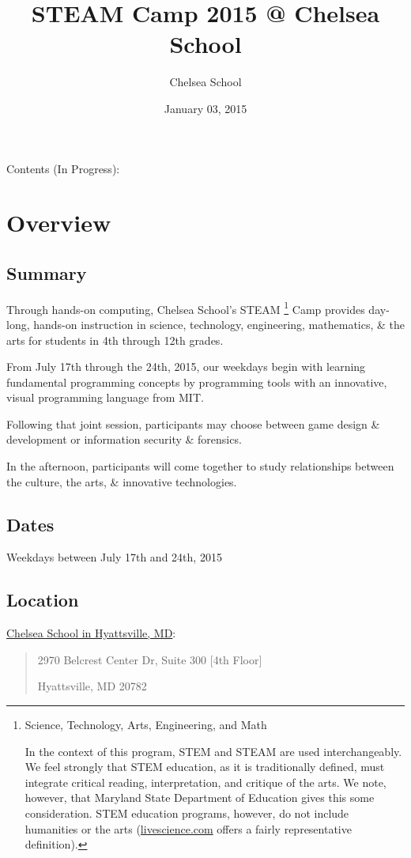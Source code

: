 \documentclass[letterpaper,10pt,english]{sphinxmanual}
\title{STEAM Camp 2015 @ Chelsea School}
\date{January 03, 2015}
\author{Chelsea School}
\begin{document}
\maketitle
\tableofcontents
{}\label{indepth::doc}


Contents (In Progress):


\chapter{Overview}
\label{description:steam-camp-2015}\label{description:overview}\label{description::doc}

\section{Summary}
\label{description:summary}
Through hands-on computing, Chelsea School's STEAM \footnote{
Science, Technology, Arts, Engineering, and Math

In the context of this program, STEM and STEAM are used interchangeably. We feel strongly that STEM education, as it is traditionally defined, must integrate critical reading, interpretation, and critique of the arts. We note, however, that Maryland State Department of Education gives this some consideration. STEM education programs, however, do not include humanities or the arts (\href{http://www.livescience.com/43296-what-is-stem-education.html}{livescience.com} offers a fairly representative definition).
} Camp provides day-long, hands-on instruction in science, technology, engineering, mathematics, \& the arts for students in 4th through 12th grades.

From July 17th through the 24th, 2015, our weekdays begin with learning fundamental programming concepts by programming tools with an innovative, visual programming language from MIT.

Following that joint session, participants may choose between game design \& development or information security \& forensics.

In the afternoon, participants will come together to study relationships between the culture, the arts, \& innovative technologies.


\section{Dates}
\label{description:dates}
Weekdays between July 17th and 24th, 2015


\section{Location}
\label{description:location}
\href{http://chelseaschool.edu/about/directions}{Chelsea School in Hyattsville, MD}:
\begin{quote}

2970 Belcrest Center Dr, Suite 300 {[}4th Floor{]}

Hyattsville, MD 20782
\end{quote}
\end{document}
